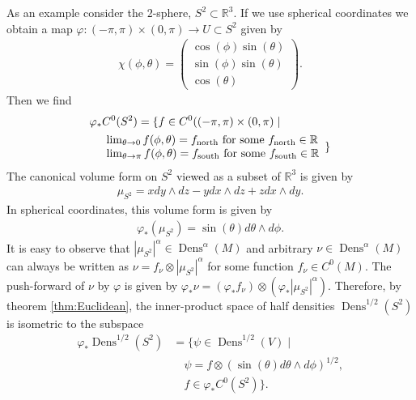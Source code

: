 \documentclass[letterpaper, 12 pt]{amsart}
\newcommand{\R}{\mathbb{R}}
\DeclareMathOperator{\Dens}{Dens}
\begin{document}

  As an example consider the $2$-sphere, $S^2 \subset \R^3$.
  If we use spherical coordinates we obtain a map
  $\varphi: (-\pi,\pi) \times (0,\pi) \to U \subset S^2$
  given by
  \begin{align*}
    \chi(\phi,\theta) = \begin{pmatrix}
      \cos(\phi) \sin(\theta) \\
      \sin(\phi) \sin(\theta) \\
      \cos(\theta)
      \end{pmatrix}.
  \end{align*}
  Then we find
  \begin{align*}
    &\varphi_*C^0(S^2) = \{
      f \in C^0( (-\pi,\pi)\times (0,\pi) \mid \\
    &\quad \begin{array}{l}
      \lim_{\theta \to 0} f(\phi,\theta) = f_{\rm north} \text{ for some } f_{\rm north} \in \R \\
      \lim_{\theta \to \pi} f(\phi,\theta) = f_{\rm south} \text{ for some } f_{\rm south} \in \R 
    \end{array}
    \}
  \end{align*}
  The canonical volume form on $S^2$ viewed as a subset of $\R^3$ is 
  given by
  \begin{align*}
    \mu_{S^2} = x dy \wedge dz - y dx \wedge dz + z dx \wedge dy.
  \end{align*}
  In spherical coordinates, this volume form is given by
  \begin{align*}
    \varphi_*(\mu_{S^2}) = \sin(\theta) d\theta \wedge d\phi.
  \end{align*}
  It is easy to observe that $|\mu_{S^2}|^\alpha \in \Dens^\alpha(M)$
  and arbitrary $\nu \in \Dens^\alpha(M)$ can always be written
  as $\nu = f_{\nu} \otimes |\mu_{S^2}|^\alpha$ for some function 
  $f_\nu \in C^0(M)$.
  The push-forward of $\nu$ by $\varphi$ is given by
  $\varphi_*\nu = (\varphi_*f_\nu) \otimes (\varphi_*|\mu_{S^2}|^\alpha)$.
  Therefore, by theorem \ref{thm:Euclidean},
  the inner-product space of half densities $\Dens^{1/2}(S^2)$
  is isometric to the subspace
  \begin{align*}
    \varphi_* \Dens^{1/2}(S^2) &= \{ \psi \in \Dens^{1/2}(V) \mid \\
    & \quad \psi = f \otimes  (\sin(\theta) d\theta \wedge d\phi)^{1/2} ,\\
    & \quad f \in \varphi_*C^0(S^2) \}.
  \end{align*}
\end{document}
